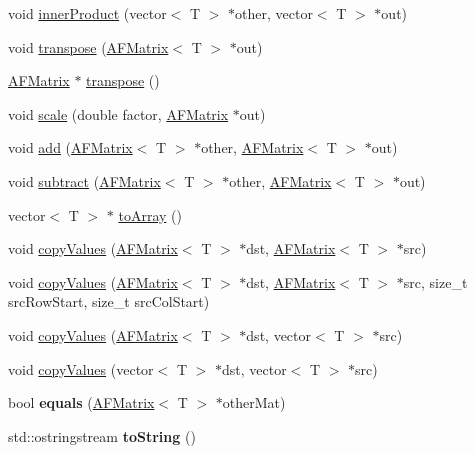 \begin{DoxyCompactItemize}
\item 
void \hyperlink{classAFMatrix_a4fa983f9e6a6c59e15bfc019d5c380b9}{inner\+Product} (vector$<$ T $>$ $\ast$other, vector$<$ T $>$ $\ast$out)
\item 
void \hyperlink{classAFMatrix_ae407612eda3533d1b96ed0fc41ff9d85}{transpose} (\hyperlink{classAFMatrix}{A\+F\+Matrix}$<$ T $>$ $\ast$out)
\item 
\hyperlink{classAFMatrix}{A\+F\+Matrix} $\ast$ \hyperlink{classAFMatrix_afdd4d2d699db425d02bab1061366616a}{transpose} ()
\item 
void \hyperlink{classAFMatrix_a7dd8d7a0e20f2c4d8580e1fe827809c8}{scale} (double factor, \hyperlink{classAFMatrix}{A\+F\+Matrix} $\ast$out)
\item 
void \hyperlink{classAFMatrix_a01822da7fbed75d3d21791e017e69d84}{add} (\hyperlink{classAFMatrix}{A\+F\+Matrix}$<$ T $>$ $\ast$other, \hyperlink{classAFMatrix}{A\+F\+Matrix}$<$ T $>$ $\ast$out)
\item 
void \hyperlink{classAFMatrix_ad45b23088511a63c68b5b8d0179e2fb7}{subtract} (\hyperlink{classAFMatrix}{A\+F\+Matrix}$<$ T $>$ $\ast$other, \hyperlink{classAFMatrix}{A\+F\+Matrix}$<$ T $>$ $\ast$out)
\item 
vector$<$ T $>$ $\ast$ \hyperlink{classAFMatrix_af52ad0a9f20833c04caf93053865bcb4}{to\+Array} ()
\item 
void \hyperlink{classAFMatrix_a3af0a59b91c2d8f7104f2f8ef15743f2}{copy\+Values} (\hyperlink{classAFMatrix}{A\+F\+Matrix}$<$ T $>$ $\ast$dst, \hyperlink{classAFMatrix}{A\+F\+Matrix}$<$ T $>$ $\ast$src)
\item 
void \hyperlink{classAFMatrix_a6d292f066e738be27e299d0a619faa07}{copy\+Values} (\hyperlink{classAFMatrix}{A\+F\+Matrix}$<$ T $>$ $\ast$dst, \hyperlink{classAFMatrix}{A\+F\+Matrix}$<$ T $>$ $\ast$src, size\+\_\+t src\+Row\+Start, size\+\_\+t src\+Col\+Start)
\item 
void \hyperlink{classAFMatrix_a63cc8c6b50d757fc75049a35a9123588}{copy\+Values} (\hyperlink{classAFMatrix}{A\+F\+Matrix}$<$ T $>$ $\ast$dst, vector$<$ T $>$ $\ast$src)
\item 
void \hyperlink{classAFMatrix_ada5bb3515ff55269519fba1f355b5264}{copy\+Values} (vector$<$ T $>$ $\ast$dst, vector$<$ T $>$ $\ast$src)
\item 
\mbox{\label{classAFMatrix_a9ab0fa675607205bf012bea2481e1a9c}} 
bool {\bfseries equals} (\hyperlink{classAFMatrix}{A\+F\+Matrix}$<$ T $>$ $\ast$other\+Mat)
\item 
\mbox{\label{classAFMatrix_afc86b276fd0e04ef5bade3058a858505}} 
std\+::ostringstream {\bfseries to\+String} ()
\end{DoxyCompactItemize}
